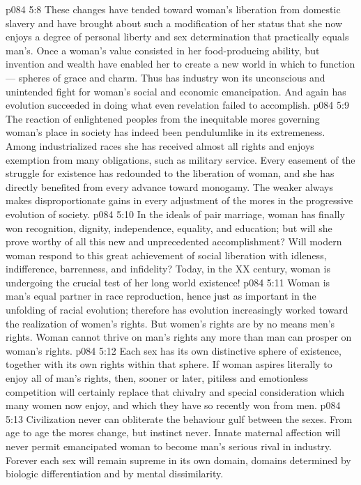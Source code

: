 \vs p084 5:8 These changes have tended toward woman’s liberation from domestic slavery and have brought about such a modification of her status that she now enjoys a degree of personal liberty and sex determination that practically equals man’s. Once a woman’s value consisted in her food\hyp{}producing ability, but invention and wealth have enabled her to create a new world in which to function --- spheres of grace and charm. Thus has industry won its unconscious and unintended fight for woman’s social and economic emancipation. And again has evolution succeeded in doing what even revelation failed to accomplish.
\vs p084 5:9 \pc The reaction of enlightened peoples from the inequitable mores governing woman’s place in society has indeed been pendulumlike in its extremeness. Among industrialized races she has received almost all rights and enjoys exemption from many obligations, such as military service. Every easement of the struggle for existence has redounded to the liberation of woman, and she has directly benefited from every advance toward monogamy. The weaker always makes disproportionate gains in every adjustment of the mores in the progressive evolution of society.
\vs p084 5:10 In the ideals of pair marriage, woman has finally won recognition, dignity, independence, equality, and education; but will she prove worthy of all this new and unprecedented accomplishment? Will modern woman respond to this great achievement of social liberation with idleness, indifference, barrenness, and infidelity? Today, in the XX century, woman is undergoing the crucial test of her long world existence!
\vs p084 5:11 Woman is man’s equal partner in race reproduction, hence just as important in the unfolding of racial evolution; therefore has evolution increasingly worked toward the realization of women’s rights. But women’s rights are by no means men’s rights. Woman cannot thrive on man’s rights any more than man can prosper on woman’s rights.
\vs p084 5:12 Each sex has its own distinctive sphere of existence, together with its own rights within that sphere. If woman aspires literally to enjoy all of man’s rights, then, sooner or later, pitiless and emotionless competition will certainly replace that chivalry and special consideration which many women now enjoy, and which they have so recently won from men.
\vs p084 5:13 Civilization never can obliterate the behaviour gulf between the sexes. From age to age the mores change, but instinct never. Innate maternal affection will never permit emancipated woman to become man’s serious rival in industry. Forever each sex will remain supreme in its own domain, domains determined by biologic differentiation and by mental dissimilarity.
